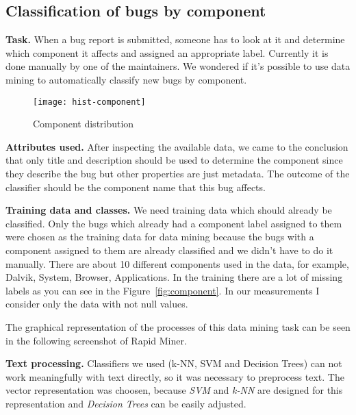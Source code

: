 \subsection{Classification of bugs by component} %
\label{sub:Classification of bugs bugs by component}

{\bf Task.} When a bug report is submitted, someone has to look at it and determine which component it affects and assigned an appropriate label. Currently it is done manually by one of the maintainers. We wondered if it's possible to use data mining to automatically classify new bugs by component.

\begin{figure}[!htp]
\begin{center} 
\texttt{[image: hist-component]}
\caption{Component distribution}
\end{center}
\end{figure}

{\bf Attributes used.} After inspecting the available data, we came to the conclusion that only title and description should be used to determine the component since they describe the bug but other properties are just metadata. The outcome of the classifier should be the component name that this bug affects.

{\bf Training data and classes.} We need training data which should already be classified. Only the bugs which already had a component label assigned to them were chosen as the training data for data mining because the bugs with a component assigned to them are already classified and we didn't have to do it manually. There are about 10 different components used in the data, for example, Dalvik, System, Browser, Applications.
In the training there are a lot of missing labels as you can see in the  Figure~\ref{fig:component}. In our measurements I consider only the data with not null values.

The graphical representation of the processes of this data mining task can be seen in the following screenshot of Rapid Miner.


{\bf Text processing.} Classifiers we used (k-NN, SVM and Decision Trees) can not work meaningfully with text directly, so it was necessary to preprocess text. The vector representation was choosen, because {\it SVM} and {\it k-NN} are designed for this representation and {\it Decision Trees} can be easily adjusted.

